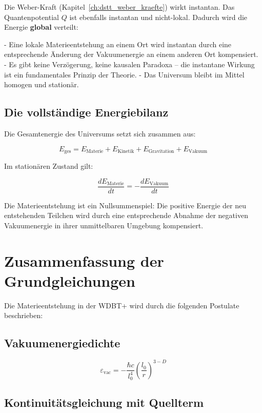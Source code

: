 Die Weber-Kraft (Kapitel~\ref{ch:dstt_weber_kraefte}) wirkt instantan. Das
Quantenpotential \( Q \) ist ebenfalls instantan und nicht-lokal. Dadurch wird
die Energie \textbf{global} verteilt:

- Eine lokale Materieentstehung an einem Ort wird instantan durch eine
  entsprechende Änderung der Vakuumenergie an einem anderen Ort kompensiert.
- Es gibt keine Verzögerung, keine kausalen Paradoxa – die instantane Wirkung
  ist ein fundamentales Prinzip der Theorie.
- Das Universum bleibt im Mittel homogen und stationär.

\subsection{Die vollständige Energiebilanz}
\label{sub:materieentstehung_bilanz}

Die Gesamtenergie des Universums setzt sich zusammen aus:

\[
E_{\text{ges}} = E_{\text{Materie}} + E_{\text{Kinetik}} + E_{\text{Gravitation}} + E_{\text{Vakuum}}
\]

Im stationären Zustand gilt:

\[
\frac{dE_{\text{Materie}}}{dt} = -\frac{dE_{\text{Vakuum}}}{dt}
\]

Die Materieentstehung ist ein Nullsummenspiel: Die positive Energie der neu
entstehenden Teilchen wird durch eine entsprechende Abnahme der negativen
Vakuumenergie in ihrer unmittelbaren Umgebung kompensiert.

\section{Zusammenfassung der Grundgleichungen}
\label{app:materieentstehung_grundgleichungen}

Die Materieentstehung in der WDBT+ wird durch die folgenden Postulate beschrieben:

\subsection{Vakuumenergiedichte}

\[
\boxed{\varepsilon_{\text{vac}} = -\frac{\hbar c}{l_0^4} \left( \frac{l_0}{r} \right)^{3-D}}
\]

\subsection{Kontinuitätsgleichung mit Quellterm}

